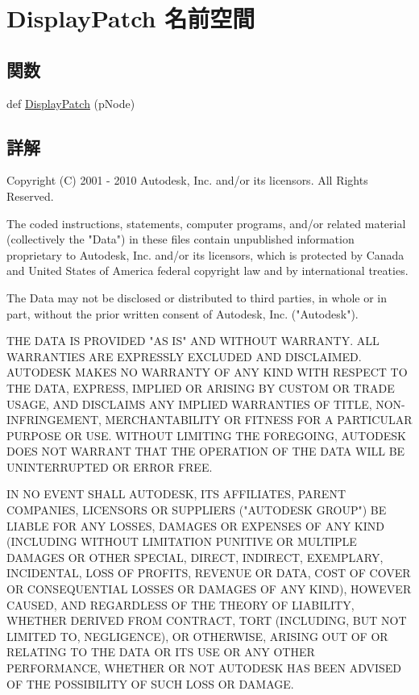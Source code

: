 \hypertarget{namespace_display_patch}{}\section{Display\+Patch 名前空間}
\label{namespace_display_patch}
\subsection*{関数}
\begin{DoxyCompactItemize}
\item 
def \hyperlink{namespace_display_patch_a48c0fc18609dd4a4a0694745adb652aa}{Display\+Patch} (p\+Node)
\end{DoxyCompactItemize}


\subsection{詳解}
\begin{DoxyVerb} Copyright (C) 2001 - 2010 Autodesk, Inc. and/or its licensors.
 All Rights Reserved.

 The coded instructions, statements, computer programs, and/or related material 
 (collectively the "Data") in these files contain unpublished information 
 proprietary to Autodesk, Inc. and/or its licensors, which is protected by 
 Canada and United States of America federal copyright law and by international 
 treaties. 
 
 The Data may not be disclosed or distributed to third parties, in whole or in
 part, without the prior written consent of Autodesk, Inc. ("Autodesk").

 THE DATA IS PROVIDED "AS IS" AND WITHOUT WARRANTY.
 ALL WARRANTIES ARE EXPRESSLY EXCLUDED AND DISCLAIMED. AUTODESK MAKES NO
 WARRANTY OF ANY KIND WITH RESPECT TO THE DATA, EXPRESS, IMPLIED OR ARISING
 BY CUSTOM OR TRADE USAGE, AND DISCLAIMS ANY IMPLIED WARRANTIES OF TITLE, 
 NON-INFRINGEMENT, MERCHANTABILITY OR FITNESS FOR A PARTICULAR PURPOSE OR USE. 
 WITHOUT LIMITING THE FOREGOING, AUTODESK DOES NOT WARRANT THAT THE OPERATION
 OF THE DATA WILL BE UNINTERRUPTED OR ERROR FREE. 
 
 IN NO EVENT SHALL AUTODESK, ITS AFFILIATES, PARENT COMPANIES, LICENSORS
 OR SUPPLIERS ("AUTODESK GROUP") BE LIABLE FOR ANY LOSSES, DAMAGES OR EXPENSES
 OF ANY KIND (INCLUDING WITHOUT LIMITATION PUNITIVE OR MULTIPLE DAMAGES OR OTHER
 SPECIAL, DIRECT, INDIRECT, EXEMPLARY, INCIDENTAL, LOSS OF PROFITS, REVENUE
 OR DATA, COST OF COVER OR CONSEQUENTIAL LOSSES OR DAMAGES OF ANY KIND),
 HOWEVER CAUSED, AND REGARDLESS OF THE THEORY OF LIABILITY, WHETHER DERIVED
 FROM CONTRACT, TORT (INCLUDING, BUT NOT LIMITED TO, NEGLIGENCE), OR OTHERWISE,
 ARISING OUT OF OR RELATING TO THE DATA OR ITS USE OR ANY OTHER PERFORMANCE,
 WHETHER OR NOT AUTODESK HAS BEEN ADVISED OF THE POSSIBILITY OF SUCH LOSS
 OR DAMAGE. \end{DoxyVerb}
 

